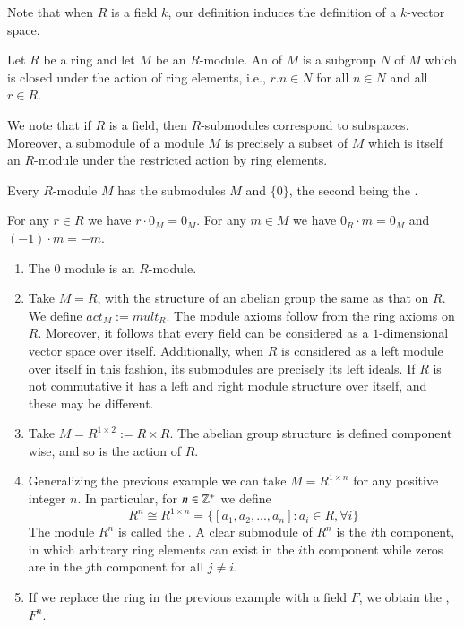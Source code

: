 Note that when $R$ is a field $k$, our definition induces the definition of a $k$-vector space.

\begin{defn}
    Let $R$ be a ring and let $M$ be an $R$-module. An  of $M$ is a subgroup $N$ of $M$ which is closed under the action of ring elements, i.e., $r.n \in N$ for all $n \in N$ and all $r \in R$.
\end{defn}

We note that if $R$ is a field, then $R$-submodules correspond to subspaces. Moreover, a submodule of a module $M$ is precisely a subset of $M$ which is itself an $R$-module under the restricted action by ring elements.

Every $R$-module $M$ has the submodules $M$ and $\{0\}$, the second being the .

\begin{lem}
    For any $r \in R$ we have $r \cdot 0_M = 0_M$. For any $m \in M$ we have $0_R\cdot m = 0_M$ and $(-1)\cdot m = -m$.
\end{lem}


\begin{eg}
    \leavevmode
    \begin{enumerate}
        \item The $0$ module is an $R$-module.
        \item Take $M =R$, with the structure of an abelian group the same as that on $R$. We define $act_M := mult_R$. The module axioms follow from the ring axioms on $R$. Moreover, it follows that every field can be considered as a $1$-dimensional vector space over itself. Additionally, when $R$ is considered as a left module over itself in this fashion, its submodules are precisely its left ideals. If $R$ is not commutative it has a left and right module structure over itself, and these may be different. 
        \item Take $M = R^{1\times 2} := R\times R$. The abelian group structure is defined component wise, and so is the action of $R$.
        \item Generalizing the previous example we can take $M = R^{1\times n}$ for any positive integer $n$. In particular, for $n \in \mathbb Z^+$ we define \begin{equation*}
                R^n \cong R^{1\times n}  = \{[a_1,a_2,...,a_n]: a_i \in R, \forall i\}
        \end{equation*}
            The module $R^n$ is called the . A clear submodule of $R^n$ is the $i$th component, in which arbitrary ring elements can exist in the $i$th component while zeros are in the $j$th component for all $j \neq i$.
        \item If we replace the ring in the previous example with a field $F$, we obtain the , $F^n$.
    \end{enumerate}
\end{eg}

